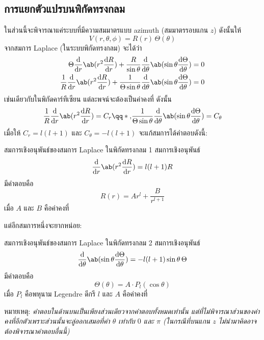 \subsection{การแยกตัวแปรบนพิกัดทรงกลม}
ในส่วนนี้จะพิจารณาแค่ระบบที่มีความสมมาตรแบบ azimuth (สมมาตรรอบแกน $z$) ดังนั้นให้
\[
V(r,\theta,\phi)=R(r)\,\Theta(\theta)
\]
จากสมการ Laplace (ในระบบพิกัดทรงกลม) จะได้ว่า
\begin{align*}
    \Theta\odv{}{r}\ab(r^2\odv{R}{r})+\frac{R}{\sin\theta}\odv{}{\theta}\ab(\sin\theta\odv{\Theta}{\theta})&=0\\
    \frac{1}{R}\odv{}{r}\ab(r^2\odv{R}{r})+\frac{1}{\Theta\sin\theta}\odv{}{\theta}\ab(\sin\theta\odv{\Theta}{\theta})&=0
\end{align*}
เช่นเดียวกับในพิกัดคาร์ทีเซียน แต่ละพจน์จะต้องเป็นค่าคงที่ ดังนั้น
\[
\frac{1}{R}\odv{}{r}\ab(r^2\odv{R}{r})=C_r\qq*{,}\frac{1}{\Theta\sin\theta}\odv{}{\theta}\ab(\sin\theta\odv{\Theta}{\theta})=C_\theta
\]
เมื่อให้ $C_r=l(l+1)$ และ $C_\theta=-l(l+1)$ จะแก้สมการได้คำตอบดังนี้:
\begin{lawbox}{สมการเชิงอนุพันธ์ของสมการ Laplace ในพิกัดทรงกลม 1}
    สมการเชิงอนุพันธ์
    \begin{equation}
        \odv{}{r}\ab(r^2\odv{R}{r})=l(l+1)R
    \end{equation}
    มีคำตอบคือ
    \begin{equation}
        R(r)=Ar^l+\frac{B}{r^{l+1}}\label{sphere1}
    \end{equation}
    เมื่อ $A$ และ $B$ คือค่าคงที่
\end{lawbox}
แต่อีกสมการหนึ่งจะยากหน่อย:
\begin{lawbox}{สมการเชิงอนุพันธ์ของสมการ Laplace ในพิกัดทรงกลม 2}
    สมการเชิงอนุพันธ์
    \begin{equation}
        \odv{}{\theta}\ab(\sin\theta\odv{\Theta}{\theta})=-l(l+1)\sin\theta\,\Theta
    \end{equation}
    มีคำตอบคือ
    \begin{equation}
        \Theta(\theta)=A\cdot P_l(\cos\theta)\label{sphere2}
    \end{equation}
    เมื่อ $P_l$ คือพหุนาม Legendre ดีกรี $l$ และ $A$ คือค่าคงที่
\end{lawbox}
หมายเหตุ: \emph{คำตอบในด้านบนเป็นเพียงส่วนเดียวจากคำตอบทั้งหมดเท่านั้น แต่ที่ไม่พิจารณาส่วนของค่าคงที่อีกตัวเพราะส่วนนั้นจะลู่ออกเสมอที่ค่า $\theta$ เท่ากับ $0$ และ $\pi$ (ในกรณีที่บนแกน $z$ ไม่นำมาคิดอาจต้องพิจารณาคำตอบอื่นนี้)}

